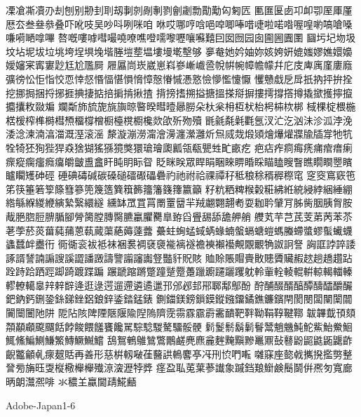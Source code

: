 凓凔凘凟刅刦刨别刱刲刵刼剚剠剮剸剹劊劌勡勩勱匃匑匟
匭匲匽卥卭卹卾厔厙厪厯厺叁叄叅叠吓吪吱吴吵呌咧咪咱
咻哎哪哼唅唈唕唧唪唶啑啦喏喒喔喤喲嗃嗆嗓嗛嗬嗮嗱嗶
嗸嘅嘍嘑嘒嘬嘵嘹噍噔嚅嚟嚦嚷囌囏囙囡囫园囱圇圌圚圛
圝圬圮圽圾坟坫坭坺垃垗垮埕埧堍堦塍塏塟塭塿墁墘墼够
夣奙她妗妯妳姟姱姸媲媸嫪嫶嬛嬝嬡嬸宷寗寠尟尪尬尶屙
屜屭峝崁崴崽嵙嵾嶃巇巹帨帲帵幛幨幪幷庀庋庳庽廑廔廕
彍徬忪怇恉恔恧悻惄惽愊愖愪愶慞慤慻慽慿憝憸懜懢懥懨
戄戇戱戹戽扺抐抨拚拴挖挪挶捆捋捓捱捵捿掂掊掮掯揪揸
揹搒搘搠搤搪搵搽搿摒摟摴撐撘撙撬撳擭擰攛攟攮敉敠斒
斕斴斾旈旎旐旟晾暋暌暳曀曏朥朵杕枀枏枑枤枱枵枾栨梆
棫棵椗椳椸楛楥榨榫榯槥槱橊橕橧橱檯櫈櫉欃欻欿歽歾殰
毷毹氄氉氍氬汊汒汔汹沬沴泒浡浼涹淰湅湳湻湽溉溼滚滛
漦漩漰澇澝澮澷瀍瀠灉炘炰烕烖煅熲燴爗爟牃牏牐牚牠牨
牷犄狉狥狴猂猋猞猢猺猻獍獘獧瑲璯瓟瓤瓴瓻甖甡甿畞疙
疤痁痄痌痗痜痡痯瘄瘌瘝瘲瘸癅癊癟皭皽盙盫盰盹眀眎眢
眨眯眹眾睅睊睏睞睤睧睬瞄瞌瞍瞖瞧瞯瞷瞾矉矑矙矱砷硜
硾碘碡碱碳磉磓礌礟礧礨礿祂祔祫祼禫秄秪稂稌稰稺穄窀
窆窔窵窽竾笫筷箠箬箰篨篲篸篼篾簉簨簯籂籒籓籛籜籝籲
籽粇粞粺糇糓糚紼絍綂綅綍綑綞綳綹緐緥緵緶縯縶繄繯繸
纁缽罛罝罥罱罿羀羋羢翽翾翿耇耍耞耹肈肎胏胔胭胰胷胺
胾脃脗脰腗腯腳膋膐膛膞臋臕臝臞臡臯臶舀舋舓舔舚舺艄
艭芄芉芑芪芰苐苪苯苶荖荸菸菼葘蒓蒱蒽蓻蕆蕖蕝薅薘虂
虆蛀蜔蜢蜮蜹蝝蝻螌螎螗螘螞螣螮螿蟉蟚蠘蠛蠭蠺衅衋衎
衕衚衮袚袛袜裍裠裯褎褏褦褵襚襜襫襰襼覥覵覼觕詉詗詧
詾誆誖誶諉諑諝諬諵謆謏謑譅譒譭譸譼譾讅讟豋豓豻貺賅
賉賒賬賵賷贁贃贗贜赮趑趟趫趲跕跧跱跲跴踁踋踦踱蹀蹁
蹍蹏蹜蹡蹩蹱蹵蹷躉躐躕躚躧躩躭軨軰輇輘輥輧輬輵輺轃
轇轑轕辠辡辢辥逄逛逯遌遛遰遴遹邋邘邠邲邽郉郰鄅鄥酚
酧酺醊醑醕醰醻醽釂釅鈀鈉鈣鉶銎銯銻銼鋁鋃鋅鋈錔錳錶
鍘鍿鎂鎊鎻鏌鏦鏹鐂鐍鐎鐮鑌閈閡閿闆闉闑闒闠闤闦阤阱
阸阽陔陴陻陿隁隃隉隖隮霃霛霡霢霨霱靧靶靽靿鞙鞟鞬鞹
韍韠韯頇頦頮顢顣颴飅餂餑餕餵饈饔饞駡騌騐騣驁驑骽骾
鬁鬉鬋鬍鬎鬙鬵魈魕魨鮀鮆鮐鮝鮰鮿鯈鯿鰂鰜鰵鱄鱖鱡鱨
鴰鴽鵪鵻鷥鷩鷳鹺麂麃麄麰黤黰黲鼉鼏鼔鼛鼢鼦鼪鼫鼴齚
齯龞龥𠃵𤸄𤿲𧵳再善形慈栟軔㗞龿鿀鿁鿂𪊲𠅘𠖱𠛬𫝓𠵘𫝚
𫝜𥧌𫝶㦤㦸𢹂𫝼㩜𠟈𢿫𧦴㫄㫋𫞂㪅𫞋㯳櫸𣟱𫞔鿌㴱𤁋㹀㢡
𫞬𫞯𫟉𫟏𫟒𦲞䜟𧰼䠞𫟰𫝥𫠍𫠗鬝鬬倂凞匇寬廊昞朗灊凞啡
氺穠𦍌蠃閫靕𩸽𪘚

Adobe-Japan1-6

